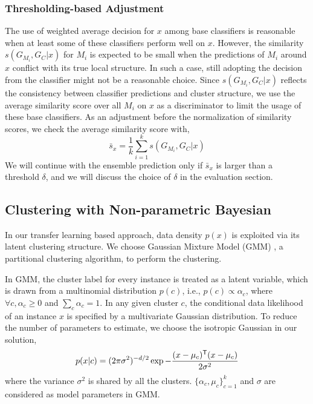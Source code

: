 \subsubsection{Thresholding-based Adjustment}
The use of weighted average decision for $x$ among base classifiers is reasonable when at least some of these classifiers perform well on $x$. However, the similarity $s(G_{M_i}, G_C|x)$ for $M_i$ is expected to be small when the predictions of $M_i$ around $x$ conflict with its true local structure. 
In such a case, still adopting the decision from the classifier might not be a reasonable choice. 
Since $s(G_{M_i}, G_C|x)$ reflects the consistency between classifier predictions and cluster structure, we use the average similarity score over all $M_i$ on $x$ as a discriminator to limit the usage of these base classifiers.
As an adjustment before the normalization of similarity scores, we check the average similarity score with,
\begin{equation}\label{ave_sim}
 \bar s_x = \frac {1}{k}\sum_{i=1}^k s(G_{M_i}, G_C|x)
\end{equation}
We will continue with the ensemble prediction only if $\bar s_x$ is larger than a threshold $\delta$, and we will discuss the choice of $\delta$ in the evaluation section.


\subsection{Clustering with Non-parametric Bayesian}
\label{sec_clustering}
In our transfer learning based approach, data density $p(x)$ is exploited via its latent clustering structure. We choose Gaussian Mixture Model (GMM) \cite{zivkovic2004improved}, a partitional clustering algorithm, to perform the clustering.

In GMM, the cluster label for every instance is treated as a latent variable, which is drawn from a multinomial distribution $p(c)$, i.e., $p(c)\propto\alpha_c$, where $\forall c, \alpha_c\ge0$ and $\sum_c\alpha_c=1$. In any given cluster $c$, the conditional data likelihood of an instance $x$ is specified by a multivariate Gaussian distribution. To reduce the number of parameters to estimate, we choose the isotropic Gaussian in our solution,
\begin{equation}
p(x|c)=(2\pi\sigma^2)^{-d/2}\exp{-\frac{(x-\mu_c)^{\mathsf{T}}(x-\mu_c)}{2\sigma^2}}
\end{equation}
where the variance $\sigma^2$ is shared by all the clusters. $\{\alpha_c, \mu_c\}^k_{c=1}$ and $\sigma$ are considered as model parameters in GMM.


